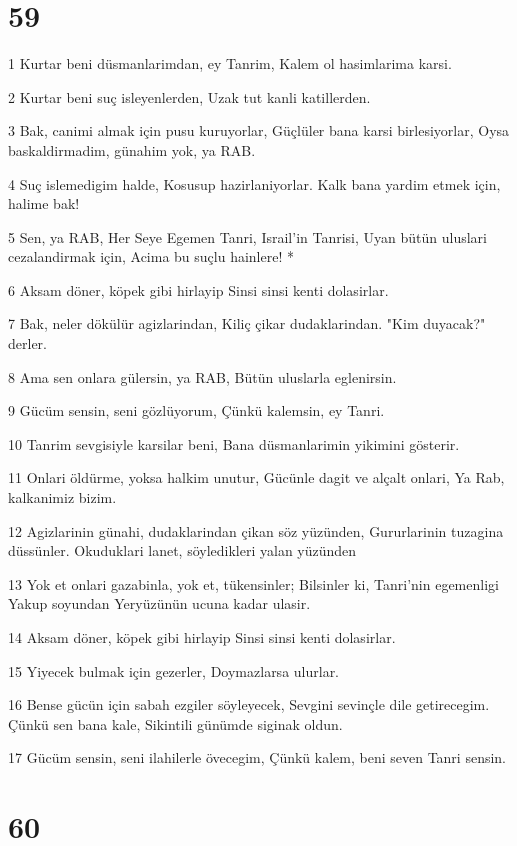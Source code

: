 \chapter{59}

\par 1 Kurtar beni düsmanlarimdan, ey Tanrim, Kalem ol hasimlarima karsi.
\par 2 Kurtar beni suç isleyenlerden, Uzak tut kanli katillerden.
\par 3 Bak, canimi almak için pusu kuruyorlar, Güçlüler bana karsi birlesiyorlar, Oysa baskaldirmadim, günahim yok, ya RAB.
\par 4 Suç islemedigim halde, Kosusup hazirlaniyorlar. Kalk bana yardim etmek için, halime bak!
\par 5 Sen, ya RAB, Her Seye Egemen Tanri, Israil'in Tanrisi, Uyan bütün uluslari cezalandirmak için, Acima bu suçlu hainlere! *
\par 6 Aksam döner, köpek gibi hirlayip Sinsi sinsi kenti dolasirlar.
\par 7 Bak, neler dökülür agizlarindan, Kiliç çikar dudaklarindan. "Kim duyacak?" derler.
\par 8 Ama sen onlara gülersin, ya RAB, Bütün uluslarla eglenirsin.
\par 9 Gücüm sensin, seni gözlüyorum, Çünkü kalemsin, ey Tanri.
\par 10 Tanrim sevgisiyle karsilar beni, Bana düsmanlarimin yikimini gösterir.
\par 11 Onlari öldürme, yoksa halkim unutur, Gücünle dagit ve alçalt onlari, Ya Rab, kalkanimiz bizim.
\par 12 Agizlarinin günahi, dudaklarindan çikan söz yüzünden, Gururlarinin tuzagina düssünler. Okuduklari lanet, söyledikleri yalan yüzünden
\par 13 Yok et onlari gazabinla, yok et, tükensinler; Bilsinler ki, Tanri'nin egemenligi Yakup soyundan Yeryüzünün ucuna kadar ulasir.
\par 14 Aksam döner, köpek gibi hirlayip Sinsi sinsi kenti dolasirlar.
\par 15 Yiyecek bulmak için gezerler, Doymazlarsa ulurlar.
\par 16 Bense gücün için sabah ezgiler söyleyecek, Sevgini sevinçle dile getirecegim. Çünkü sen bana kale, Sikintili günümde siginak oldun.
\par 17 Gücüm sensin, seni ilahilerle övecegim, Çünkü kalem, beni seven Tanri sensin.

\chapter{60}

